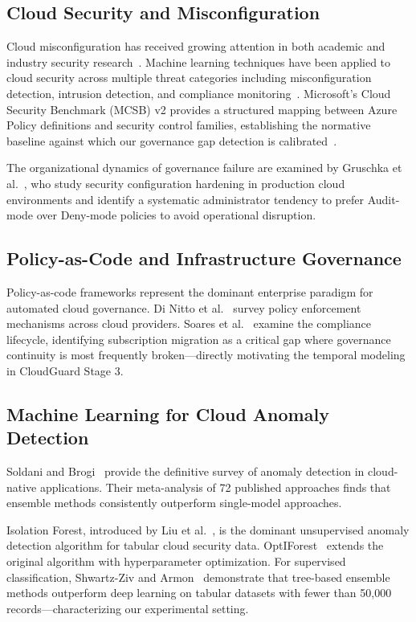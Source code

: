 \documentclass[conference]{IEEEtran}
\begin{document}
\subsection{Cloud Security and Misconfiguration}
Cloud misconfiguration has received growing attention in both academic 
and industry security research~\cite{nassif2021,chen2020}. 
Machine learning techniques have been applied to cloud security across 
multiple threat categories including misconfiguration detection, 
intrusion detection, and compliance monitoring~\cite{nassif2021}. 
Microsoft's Cloud Security Benchmark (MCSB) v2 provides a structured 
mapping between Azure Policy definitions and security control families, 
establishing the normative baseline against which our governance gap 
detection is calibrated~\cite{microsoft2024mcsb}.

The organizational dynamics of governance failure are examined by 
Gruschka et al.~\cite{gruschka2023}, who study security configuration 
hardening in production cloud environments and identify a systematic 
administrator tendency to prefer Audit-mode over Deny-mode policies to 
avoid operational disruption.

\subsection{Policy-as-Code and Infrastructure Governance}
Policy-as-code frameworks represent the dominant enterprise paradigm 
for automated cloud governance. Di Nitto et al.~\cite{dinitto2022} 
survey policy enforcement mechanisms across cloud providers. 
Soares et al.~\cite{soares2022} examine the compliance lifecycle, 
identifying subscription migration as a critical gap where governance 
continuity is most frequently broken---directly motivating the 
temporal modeling in CloudGuard Stage 3.

\subsection{Machine Learning for Cloud Anomaly Detection}
Soldani and Brogi~\cite{soldani2022} provide the definitive survey of 
anomaly detection in cloud-native applications. Their meta-analysis of 
72 published approaches finds that ensemble methods consistently 
outperform single-model approaches.

Isolation Forest, introduced by Liu et al.~\cite{liu2008}, is the 
dominant unsupervised anomaly detection algorithm for tabular cloud 
security data. OptIForest~\cite{xiang2023} extends the original 
algorithm with hyperparameter optimization. For supervised 
classification, Shwartz-Ziv and Armon~\cite{shwartzziv2022} 
demonstrate that tree-based ensemble methods outperform deep learning 
on tabular datasets with fewer than 50,000 records---characterizing 
our experimental setting.
\end{document}
